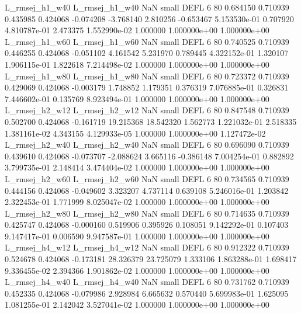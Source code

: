 L_rmsej_h1_w40 L_rmsej_h1_w40                   NaN      small     DEFL                 6 80 0.684150       0.710939 0.435985       0.424068   -0.074208     -3.768140      2.810256    -0.653467   5.153530e-01  0.707920 4.810787e-01     2.473375   1.552990e-02            1.000000    1.000000e+00        1.000000e+00
L_rmsej_h1_w60 L_rmsej_h1_w60                   NaN      small     DEFL                 6 80 0.740525       0.710939 0.446255       0.424068   -0.051102      4.161542      5.231970     0.789445   4.322152e-01  1.320107 1.906115e-01     1.822618   7.214498e-02            1.000000    1.000000e+00        1.000000e+00
L_rmsej_h1_w80 L_rmsej_h1_w80                   NaN      small     DEFL                 6 80 0.723372       0.710939 0.429069       0.424068   -0.003179      1.748852      1.179351     0.376319   7.076885e-01  0.326831 7.446602e-01     0.135769   8.923494e-01            1.000000    1.000000e+00        1.000000e+00
L_rmsej_h2_w12 L_rmsej_h2_w12                   NaN      small     DEFL                 6 80 0.847548       0.710939 0.502700       0.424068   -0.161719     19.215368     18.542320     1.562773   1.221032e-01  2.518335 1.381161e-02     4.343155   4.129933e-05            1.000000    1.000000e+00        1.127472e-02
L_rmsej_h2_w40 L_rmsej_h2_w40                   NaN      small     DEFL                 6 80 0.696090       0.710939 0.439610       0.424068   -0.073707     -2.088624      3.665116    -0.386148   7.004254e-01  0.882892 3.799735e-01     2.148414   3.474404e-02            1.000000    1.000000e+00        1.000000e+00
L_rmsej_h2_w60 L_rmsej_h2_w60                   NaN      small     DEFL                 6 80 0.734565       0.710939 0.444156       0.424068   -0.049602      3.323207      4.737114     0.639108   5.246016e-01  1.203842 2.322453e-01     1.771999   8.025047e-02            1.000000    1.000000e+00        1.000000e+00
L_rmsej_h2_w80 L_rmsej_h2_w80                   NaN      small     DEFL                 6 80 0.714635       0.710939 0.425747       0.424068   -0.000160      0.519906      0.395926     0.108051   9.142292e-01  0.107403 9.147417e-01     0.006590   9.947587e-01            1.000000    1.000000e+00        1.000000e+00
L_rmsej_h4_w12 L_rmsej_h4_w12                   NaN      small     DEFL                 6 80 0.912322       0.710939 0.524678       0.424068   -0.173181     28.326379     23.725079     1.333106   1.863288e-01  1.698417 9.336455e-02     2.394366   1.901862e-02            1.000000    1.000000e+00        1.000000e+00
L_rmsej_h4_w40 L_rmsej_h4_w40                   NaN      small     DEFL                 6 80 0.731762       0.710939 0.452335       0.424068   -0.079986      2.928984      6.665632     0.570440   5.699983e-01  1.625095 1.081255e-01     2.142042   3.527041e-02            1.000000    1.000000e+00        1.000000e+00
